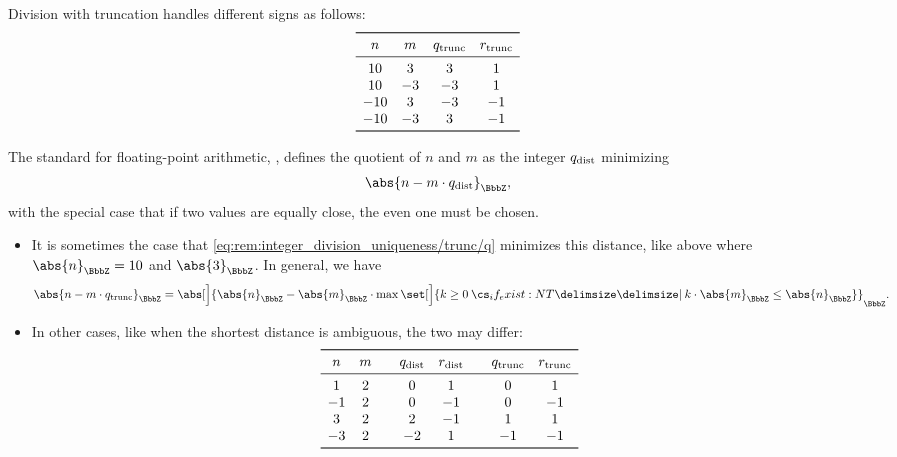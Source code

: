 \begin{remark}
\begin{thmenum}
    Division with truncation handles different signs as follows:
    \begin{equation*}
      \begin{array}{*{4}{c}}
        \toprule
        n   & m  & q_{\T{trunc}} & r_{\T{trunc}} \\
        \midrule
        10  & 3  & 3             & 1             \\
        10  & -3 & -3            & 1             \\
        -10 & 3  & -3            & -1            \\
        -10 & -3 & 3             & -1            \\
        \bottomrule
      \end{array}
    \end{equation*}

     The standard for floating-point arithmetic, \cite[31]{IEEE:754:2019}, defines the quotient of \( n \) and \( m \) as the integer \( q_{\T{dist}} \) minimizing
    \begin{equation}\label{eq:rem:integer_division_uniqueness/dist/q}
      \abs{n - m \cdot q_{\T{dist}}}_\BbbZ,
    \end{equation}
    with the special case that if two values are equally close, the even one must be chosen.

    \begin{itemize}
      \item It is sometimes the case that \eqref{eq:rem:integer_division_uniqueness/trunc/q} minimizes this distance, like above where \( \abs{n}_\BbbZ = 10 \) and \( \abs{3}_\BbbZ \). In general, we have
      \begin{equation*}
        \abs{ n - m \cdot q_{\T{trunc}} }_\BbbZ
        =
        \abs[\Big]{ \abs{n}_\BbbZ - \abs{m}_\BbbZ \cdot \max\set[\Big]{ k \geq 0 \given* k \cdot \abs{m}_\BbbZ \leq \abs{n}_\BbbZ } }_\BbbZ.
      \end{equation*}

      \item In other cases, like when the shortest distance is ambiguous, the two may differ:
      \begin{equation*}
        \begin{array}{c c !{\quad} c c !{\quad} c c}
          \toprule
          n  & m & q_{\T{dist}} & r_{\T{dist}} & q_{\T{trunc}} & r_{\T{trunc}} \\
          \midrule
          1  & 2 & 0            & 1            & 0             & 1             \\
          -1 & 2 & 0            & -1           & 0             & -1            \\
          3  & 2 & 2            & -1           & 1             & 1             \\
          -3 & 2 & -2           & 1            & -1            & -1            \\
          \bottomrule
        \end{array}
      \end{equation*}


\end{itemize}
\end{thmenum}
\end{remark}
